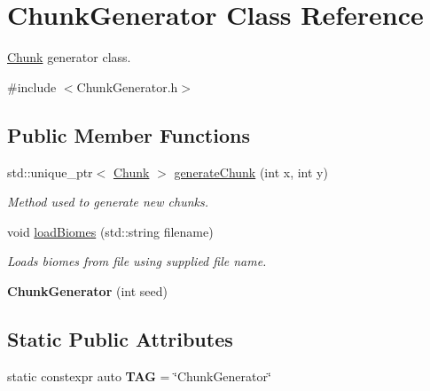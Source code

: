 \hypertarget{classChunkGenerator}{\section{Chunk\-Generator Class Reference}
\label{classChunkGenerator}
}


\hyperlink{classChunk}{Chunk} generator class.  




{\ttfamily \#include $<$Chunk\-Generator.\-h$>$}

\subsection*{Public Member Functions}
\begin{DoxyCompactItemize}
\item 
std\-::unique\-\_\-ptr$<$ \hyperlink{classChunk}{Chunk} $>$ \hyperlink{classChunkGenerator_acb1e4d2b1d2d620a92fd3e311ddd42cf}{generate\-Chunk} (int x, int y)
\begin{DoxyCompactList}\small\item\em Method used to generate new chunks. \end{DoxyCompactList}\item 
\hypertarget{classChunkGenerator_a9e3abe238109f9d8b98fd1eb92d400f8}{void \hyperlink{classChunkGenerator_a9e3abe238109f9d8b98fd1eb92d400f8}{load\-Biomes} (std\-::string filename)}\label{classChunkGenerator_a9e3abe238109f9d8b98fd1eb92d400f8}

\begin{DoxyCompactList}\small\item\em Loads biomes from file using supplied file name. \end{DoxyCompactList}\item 
\hypertarget{classChunkGenerator_a5809da31d94501123d717e4c0367f80a}{{\bfseries Chunk\-Generator} (int seed)}\label{classChunkGenerator_a5809da31d94501123d717e4c0367f80a}

\end{DoxyCompactItemize}
\subsection*{Static Public Attributes}
\begin{DoxyCompactItemize}
\item 
\hypertarget{classChunkGenerator_a007ea7da3f3c609869024be0ea0fc3dd}{static constexpr auto {\bfseries T\-A\-G} = \char`\"{}Chunk\-Generator\char`\"{}}\label{classChunkGenerator_a007ea7da3f3c609869024be0ea0fc3dd}

\end{DoxyCompactItemize}


